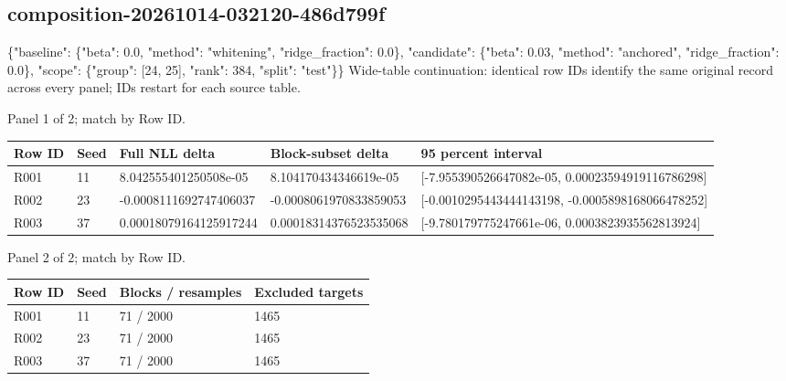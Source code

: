 \documentclass[10pt]{article}
\begin{document}
\subsection{composition-20261014-032120-486d799f}
\{"baseline": \{"beta": 0.0, "method": "whitening", "ridge\_fraction": 0.0\}, "candidate": \{"beta": 0.03, "method": "anchored", "ridge\_fraction": 0.0\}, "scope": \{"group": [24, 25], "rank": 384, "split": "test"\}\}
Wide-table continuation: identical row IDs identify the same original record across every panel; IDs restart for each source table.
\par\noindent Panel 1 of 2; match by Row ID.
{\scriptsize\setlength{\tabcolsep}{2pt}
\begin{longtable}{p{}p{}p{}p{}p{}}
Row ID & Seed & Full NLL delta & Block-subset delta & 95 percent interval \\
\hline\endhead
R001 & 11 & 8.042555401250508e-05 & 8.104170434346619e-05 & [-7.955390526647082e-05, 0.00023594919116786298] \\
R002 & 23 & -0.0008111692747406037 & -0.0008061970833859053 & [-0.0010295443444143198, -0.0005898168066478252] \\
R003 & 37 & 0.00018079164125917244 & 0.00018314376523535068 & [-9.780179775247661e-06, 0.0003823935562813924] \\
\end{longtable}}
\par\noindent Panel 2 of 2; match by Row ID.
{\scriptsize\setlength{\tabcolsep}{2pt}
\begin{longtable}{p{}p{}p{}p{}}
Row ID & Seed & Blocks / resamples & Excluded targets \\
\hline\endhead
R001 & 11 & 71 / 2000 & 1465 \\
R002 & 23 & 71 / 2000 & 1465 \\
R003 & 37 & 71 / 2000 & 1465 \\
\end{longtable}}
\end{document}
